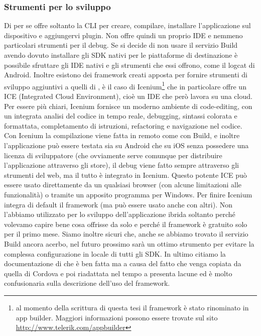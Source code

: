 		\subsubsection{Strumenti per lo sviluppo}
		Di per se \pg{} offre soltanto la CLI per creare, compilare, 
		installare l'applicazione sul dispositivo e aggiungervi plugin. Non 
		offre quindi un proprio IDE e nemmeno particolari strumenti per il 
		debug. Se si decide di non usare il servizio \pg{} Build avendo dovuto 
		installare gli SDK nativi per le piattaforme di destinazione è 
		possibile sfruttare gli IDE nativi e gli strumenti che essi offrono, 
		come il logcat di Android. Inoltre esistono dei framework creati 
		apposta per fornire strumenti di sviluppo aggiuntivi a quelli di 
		\pg{}, è il caso di Icenium\footnote{al momento della scrittura di 
		questa tesi il framework è stato rinominato in app builder. 
		Maggiori informazioni possono essere trovate sul sito 
		\url{http://www.telerik.com/appbuilder}} che in particolare offre un 
		ICE (Integrated Cloud Environment), cioè un IDE che però lavora su una 
		cloud. Per essere più chiari, Icenium fornisce un moderno ambiente di 
		code-editing, con un integrata analisi del codice in tempo reale, 
		debugging, sintassi colorata e formattata, completamento di istruzioni, 
		refactoring e navigazione nel codice. Con Icenium la compilazione 
		viene fatta in remoto come con \pg{} Build, e inoltre l'applicazione 
		può essere testata sia su Android che su iOS senza possedere una 
		licenza di sviluppatore (che ovviamente serve comunque per distribuire 
		l'applicazione attraverso gli store), il debug viene fatto sempre 
		attraverso gli strumenti del web, ma il tutto è integrato in Icenium.
		Questo potente ICE può essere usato direttamente da un qualsiasi browser 
		(con alcune limitazioni alle funzionalità) o tramite un apposito 
		programma per Windows. Per finire Icenium integra di default il 
		framework \kendomob{} (ma può essere usato anche con altri). Non 
		l'abbiamo utilizzato per lo sviluppo dell'applicazione ibrida soltanto 
		perché volevamo capire bene cosa offrisse da solo \pg{} e perché il 
		framework è gratuito solo per il primo mese. Siamo inoltre sicuri che, 
		anche se abbiamo trovato il servizio \pg{} Build ancora acerbo, nel 
		futuro prossimo sarà un ottimo strumento per evitare la complessa 
		configurazione in locale di tutti gli SDK. In ultimo citiamo la 
		documentazione di \pg{} che è ben fatta ma a causa del fatto che venga 
		copiata da quella di Cordova e poi riadattata nel tempo a \pg{} 
		presenta lacune ed è molto confusionaria sulla descrizione dell'uso 
		del framework.
		
